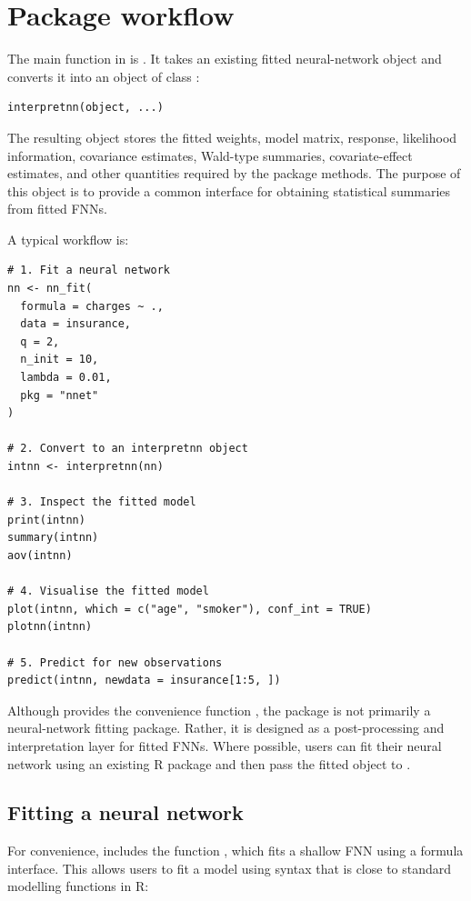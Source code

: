 \section{Package workflow}\label{sec:package-workflow}

The main function in  is .
It takes an existing fitted neural-network object and converts it into an object of class :

\begin{verbatim}
interpretnn(object, ...)
\end{verbatim}

The resulting object stores the fitted weights, model matrix, response, likelihood information, covariance estimates, Wald-type summaries, covariate-effect estimates, and other quantities required by the package methods.
The purpose of this object is to provide a common interface for obtaining statistical summaries from fitted FNNs.

A typical workflow is:

\begin{verbatim}
# 1. Fit a neural network
nn <- nn_fit(
  formula = charges ~ .,
  data = insurance,
  q = 2,
  n_init = 10,
  lambda = 0.01,
  pkg = "nnet"
)

# 2. Convert to an interpretnn object
intnn <- interpretnn(nn)

# 3. Inspect the fitted model
print(intnn)
summary(intnn)
aov(intnn)

# 4. Visualise the fitted model
plot(intnn, which = c("age", "smoker"), conf_int = TRUE)
plotnn(intnn)

# 5. Predict for new observations
predict(intnn, newdata = insurance[1:5, ])
\end{verbatim}

Although  provides the convenience function , the package is not primarily a neural-network fitting package.
Rather, it is designed as a post-processing and interpretation layer for fitted FNNs.
Where possible, users can fit their neural network using an existing R package and then pass the fitted object to .

\subsection{Fitting a neural network}\label{fitting-a-neural-network}

For convenience,  includes the function , which fits a shallow FNN using a formula interface.
This allows users to fit a model using syntax that is close to standard modelling functions in R:


